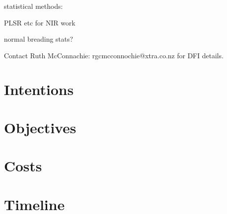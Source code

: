 \documentclass{article}
\begin{document}
statistical methods:

PLSR etc for NIR work

normal breading stats?

Contact Ruth McConnachie: rgcmcconnochie@xtra.co.nz for DFI details.

\section{Intentions}

\section{Objectives}

\section{Costs}

\section{Timeline}
\end{document}
